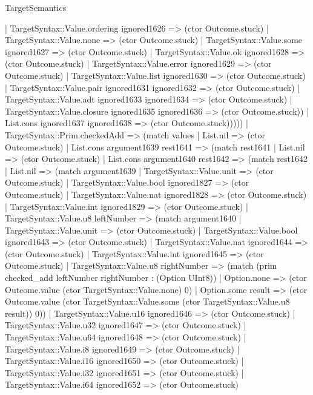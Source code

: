 \begin{lexlean}{TargetSemantics}
\begin{semanticmodule}
{              | TargetSyntax::Value.ordering ignored1626 => (ctor Outcome.stuck)
              | TargetSyntax::Value.none => (ctor Outcome.stuck)
              | TargetSyntax::Value.some ignored1627 => (ctor Outcome.stuck)
              | TargetSyntax::Value.ok ignored1628 => (ctor Outcome.stuck)
              | TargetSyntax::Value.error ignored1629 => (ctor Outcome.stuck)
              | TargetSyntax::Value.list ignored1630 => (ctor Outcome.stuck)
              | TargetSyntax::Value.pair ignored1631 ignored1632 => (ctor Outcome.stuck)
              | TargetSyntax::Value.adt ignored1633 ignored1634 => (ctor Outcome.stuck)
              | TargetSyntax::Value.closure ignored1635 ignored1636 => (ctor Outcome.stuck))
            | List.cons ignored1637 ignored1638 => (ctor Outcome.stuck)))))
    | TargetSyntax::Prim.checkedAdd => (match values
      | List.nil => (ctor Outcome.stuck)
      | List.cons argument1639 rest1641 => (match rest1641
        | List.nil => (ctor Outcome.stuck)
        | List.cons argument1640 rest1642 => (match rest1642
          | List.nil => (match argument1639
            | TargetSyntax::Value.unit => (ctor Outcome.stuck)
            | TargetSyntax::Value.bool ignored1827 => (ctor Outcome.stuck)
            | TargetSyntax::Value.nat ignored1828 => (ctor Outcome.stuck)
            | TargetSyntax::Value.int ignored1829 => (ctor Outcome.stuck)
            | TargetSyntax::Value.u8 leftNumber => (match argument1640
              | TargetSyntax::Value.unit => (ctor Outcome.stuck)
              | TargetSyntax::Value.bool ignored1643 => (ctor Outcome.stuck)
              | TargetSyntax::Value.nat ignored1644 => (ctor Outcome.stuck)
              | TargetSyntax::Value.int ignored1645 => (ctor Outcome.stuck)
              | TargetSyntax::Value.u8 rightNumber => (match (prim checked_add leftNumber rightNumber : (Option UInt8))
                | Option.none => (ctor Outcome.value (ctor TargetSyntax::Value.none) 0)
                | Option.some result => (ctor Outcome.value (ctor TargetSyntax::Value.some (ctor TargetSyntax::Value.u8 result)) 0))
              | TargetSyntax::Value.u16 ignored1646 => (ctor Outcome.stuck)
              | TargetSyntax::Value.u32 ignored1647 => (ctor Outcome.stuck)
              | TargetSyntax::Value.u64 ignored1648 => (ctor Outcome.stuck)
              | TargetSyntax::Value.i8 ignored1649 => (ctor Outcome.stuck)
              | TargetSyntax::Value.i16 ignored1650 => (ctor Outcome.stuck)
              | TargetSyntax::Value.i32 ignored1651 => (ctor Outcome.stuck)
              | TargetSyntax::Value.i64 ignored1652 => (ctor Outcome.stuck)
}
\end{semanticmodule}
\end{lexlean}
